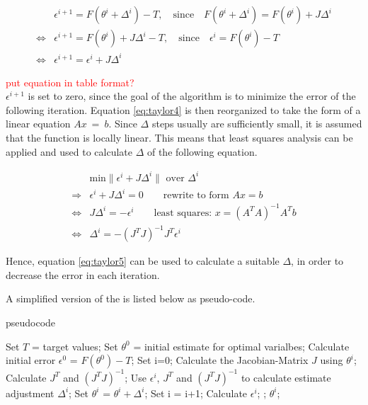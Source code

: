 \begin{align}
	& \epsilon^{i+1} = F(\theta^{i} + \Delta^{i}) - T, \quad \text{since} \quad F(\theta^{i} + \Delta^{i}) = F(\theta^{i}) + J \Delta^{i} \\
	\Leftrightarrow & \epsilon^{i+1} = F(\theta^{i}) + J \Delta^{i} - T, \quad \text{since} \quad \epsilon^{i} = F(\theta^{i}) - T \\
	\Leftrightarrow & \epsilon^{i+1} = \epsilon^{i} + J \Delta^{i} \label{eq:taylor4}
\end{align}

\textcolor{red}{put equation in table format?}\\
$\epsilon^{i+1}$ is set to zero, since the goal of the algorithm is to minimize the error of the following iteration. Equation \ref*{eq:taylor4}
is then reorganized to take the form of a linear equation $Ax~=~b$. Since $\Delta$ steps usually are sufficiently small, it is assumed that the function is locally
linear. This means that least squares analysis can be applied and used to calculate $\Delta$ of the following equation.

\begin{align}
	&\text{min} \| \epsilon^{i} + J \Delta^{i} \|\text{ over $\Delta^{i}$} \\
	\Rightarrow & \epsilon^{i} + J \Delta^{i} = 0 \qquad \text{rewrite to form $Ax = b$} \\
	\Leftrightarrow & J \Delta^{i} = -\epsilon^{i} \qquad \text{least squares: } x = (A^T A)^{-1} A^T b \\
	\Leftrightarrow & \Delta^{i} = - (J^T J)^{-1} J^T \epsilon^{i} \label{eq:taylor5}
\end{align}

Hence, equation \ref*{eq:taylor5} can be used to calculate a suitable $\Delta$, in order to decrease the error in each iteration.\newline

A simplified version of the  is listed below as pseudo-code.

\begin{algorithm}
	\caption{ pseudocode}
	\begin{algorithmic}
		\State Set $T$ = target values;
		\State Set $\theta^{0}$ = initial estimate for optimal varialbes;
		\State Calculate initial error $\epsilon^0$ = $F(\theta^0) - T$;
		\State Set i=0;
			\State Calculate the Jacobian-Matrix $J$ using $\theta^i$;
			\State Calculate $J^{T}$ and  $(J^{T}J)^{-1}$;
			\State Use $\epsilon^i$, $J^{T}$ and  $(J^{T}J)^{-1}$ to calculate estimate adjustment $\Delta^i$;
			\State Set $\theta^{i}$ = $\theta^{i} + \Delta^i$;
			\State Set i = i+1;
			\State Calculate $\epsilon^i$;
		\EndWhile;
		\State {} $\theta^i$;
	\end{algorithmic}
\end{algorithm}


